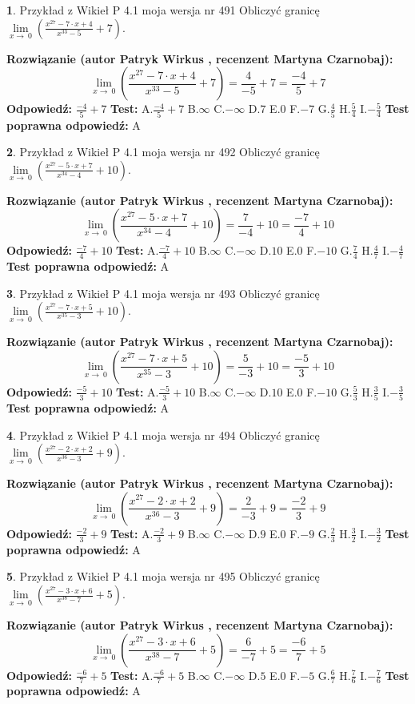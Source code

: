 \documentclass[12pt, a4paper]{article}
\theoremstyle{definition} %
\newtheorem{zad}{}
\newcommand{\zadStart}[1]{\begin{zad}#1\newline}
\newcommand{\zadStop}{\end{zad}}
\newcommand{\rozwStart}[2]{\noindent \textbf{Rozwiązanie (autor #1 , recenzent #2): }\newline}
\newcommand{\rozwStop}{\newline}
\newcommand{\odpStart}{\noindent \textbf{Odpowiedź:}\newline}
\newcommand{\odpStop}{\newline}
\newcommand{\testStart}{\noindent \textbf{Test:}\newline}
\newcommand{\testStop}{\newline}
\newcommand{\kluczStart}{\noindent \textbf{Test poprawna odpowiedź:}\newline}
\newcommand{\kluczStop}{\newline}
\begin{document}
\zadStart{Przykład z Wikieł P 4.1 moja wersja nr 491}
Obliczyć granicę $\lim\limits_{x\to\ 0}(\frac{x^{27}-7 \cdot x +4}{x^{33}-5}+7)$.
\zadStop
\rozwStart{Patryk Wirkus}{Martyna Czarnobaj}
$$\lim\limits_{x\to\ 0}(\frac{x^{27}-7 \cdot x +4}{x^{33}-5}+7)=\frac{4}{-5}+7=\frac{-4}{5}+7$$
\rozwStop
\odpStart
$\frac{-4}{5}+7$
\odpStop
\testStart
A.$\frac{-4}{5}+7$
B.$\infty$
C.$-\infty$
D.$7$
E.$0$
F.$-7$
G.$\frac{4}{5}$
H.$\frac{5}{4}$
I.$-\frac{5}{4}$
\testStop
\kluczStart
A
\kluczStop



\zadStart{Przykład z Wikieł P 4.1 moja wersja nr 492}
Obliczyć granicę $\lim\limits_{x\to\ 0}(\frac{x^{27}-5 \cdot x +7}{x^{34}-4}+10)$.
\zadStop
\rozwStart{Patryk Wirkus}{Martyna Czarnobaj}
$$\lim\limits_{x\to\ 0}(\frac{x^{27}-5 \cdot x +7}{x^{34}-4}+10)=\frac{7}{-4}+10=\frac{-7}{4}+10$$
\rozwStop
\odpStart
$\frac{-7}{4}+10$
\odpStop
\testStart
A.$\frac{-7}{4}+10$
B.$\infty$
C.$-\infty$
D.$10$
E.$0$
F.$-10$
G.$\frac{7}{4}$
H.$\frac{4}{7}$
I.$-\frac{4}{7}$
\testStop
\kluczStart
A
\kluczStop



\zadStart{Przykład z Wikieł P 4.1 moja wersja nr 493}
Obliczyć granicę $\lim\limits_{x\to\ 0}(\frac{x^{27}-7 \cdot x +5}{x^{35}-3}+10)$.
\zadStop
\rozwStart{Patryk Wirkus}{Martyna Czarnobaj}
$$\lim\limits_{x\to\ 0}(\frac{x^{27}-7 \cdot x +5}{x^{35}-3}+10)=\frac{5}{-3}+10=\frac{-5}{3}+10$$
\rozwStop
\odpStart
$\frac{-5}{3}+10$
\odpStop
\testStart
A.$\frac{-5}{3}+10$
B.$\infty$
C.$-\infty$
D.$10$
E.$0$
F.$-10$
G.$\frac{5}{3}$
H.$\frac{3}{5}$
I.$-\frac{3}{5}$
\testStop
\kluczStart
A
\kluczStop



\zadStart{Przykład z Wikieł P 4.1 moja wersja nr 494}
Obliczyć granicę $\lim\limits_{x\to\ 0}(\frac{x^{27}-2 \cdot x +2}{x^{36}-3}+9)$.
\zadStop
\rozwStart{Patryk Wirkus}{Martyna Czarnobaj}
$$\lim\limits_{x\to\ 0}(\frac{x^{27}-2 \cdot x +2}{x^{36}-3}+9)=\frac{2}{-3}+9=\frac{-2}{3}+9$$
\rozwStop
\odpStart
$\frac{-2}{3}+9$
\odpStop
\testStart
A.$\frac{-2}{3}+9$
B.$\infty$
C.$-\infty$
D.$9$
E.$0$
F.$-9$
G.$\frac{2}{3}$
H.$\frac{3}{2}$
I.$-\frac{3}{2}$
\testStop
\kluczStart
A
\kluczStop



\zadStart{Przykład z Wikieł P 4.1 moja wersja nr 495}
Obliczyć granicę $\lim\limits_{x\to\ 0}(\frac{x^{27}-3 \cdot x +6}{x^{38}-7}+5)$.
\zadStop
\rozwStart{Patryk Wirkus}{Martyna Czarnobaj}
$$\lim\limits_{x\to\ 0}(\frac{x^{27}-3 \cdot x +6}{x^{38}-7}+5)=\frac{6}{-7}+5=\frac{-6}{7}+5$$
\rozwStop
\odpStart
$\frac{-6}{7}+5$
\odpStop
\testStart
A.$\frac{-6}{7}+5$
B.$\infty$
C.$-\infty$
D.$5$
E.$0$
F.$-5$
G.$\frac{6}{7}$
H.$\frac{7}{6}$
I.$-\frac{7}{6}$
\testStop
\kluczStart
A
\kluczStop
\end{document}
